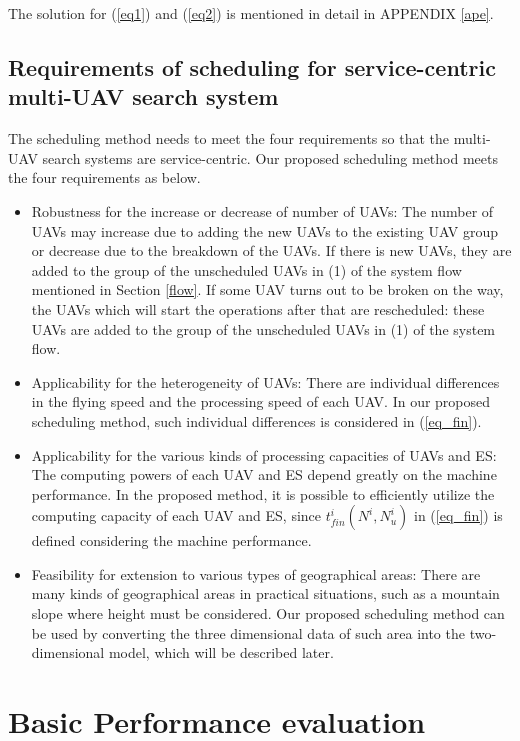 \documentclass{ieeeaccess}
\begin{document}
The solution for (\ref{eq1}) and (\ref{eq2}) is mentioned in detail in APPENDIX \ref{ape}.

\subsection{Requirements of scheduling for service-centric multi-UAV search system} \label{feature}
The scheduling method needs to meet the four requirements so that the multi-UAV search systems are service-centric.
Our proposed scheduling method meets the four requirements as below.
\begin{itemize}
\item Robustness for the increase or decrease of number of UAVs: 
The number of UAVs may increase due to adding the new UAVs to the existing UAV group or decrease due to the breakdown of the UAVs. 
If there is new UAVs, they are added to the group of the unscheduled UAVs in (1) of the system flow mentioned in Section \ref{flow}.
If some UAV turns out to be broken on the way, the UAVs which will start the operations after that are rescheduled: these UAVs   are added to the group of the unscheduled UAVs in (1) of the system flow.
%
\item Applicability for the heterogeneity of UAVs: 
There are individual differences in the flying speed and the processing speed of each UAV. 
In our proposed scheduling method, such individual differences is considered in (\ref{eq_fin}).
%
\item Applicability for the various kinds of processing capacities of UAVs and ES: 
The computing powers of each UAV and ES depend greatly on the machine performance. In the proposed method, it is possible to efficiently utilize the computing capacity of each UAV and ES, since $t_{fin}^i(N^i,N_u^i)$ in (\ref{eq_fin}) is defined considering the machine performance.
%
\item Feasibility for extension to various types of geographical areas: 
There are many kinds of geographical areas in practical situations, such as a mountain slope where height must be considered.
Our proposed scheduling method can be used by converting the three dimensional data of such area into the two-dimensional model, which will be described later.
\end{itemize}

\section{Basic Performance evaluation}\label{eva}
\end{document}
